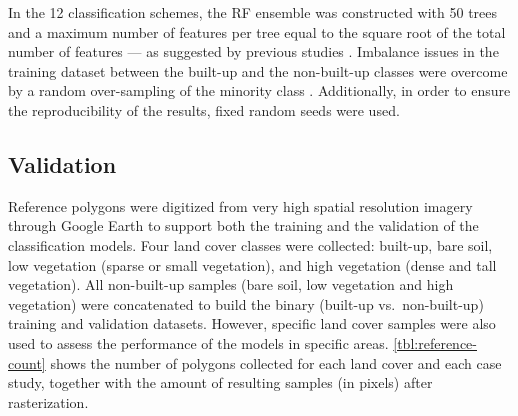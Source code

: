 \documentclass[remotesensing,article,submit,moreauthors,pdftex,10pt,a4paper]{Definitions/mdpi}
\begin{document}
In the 12 classification schemes, the RF ensemble was constructed with 50 trees
and a maximum number of features per tree equal to the square root of the total
number of features --- as suggested by previous studies \cite{Gislason2006}.
Imbalance issues in the training dataset between the built-up and the
non-built-up classes were overcome by a random over-sampling of the minority
class \cite{Lemaitre2017}. Additionally, in order to ensure the reproducibility
of the results, fixed random seeds were used.

\subsection{Validation}

Reference polygons were digitized from very high spatial resolution imagery
through Google Earth to support both the training and the validation of the
classification models. Four land cover classes were collected: built-up, bare
soil, low vegetation (sparse or small vegetation), and high vegetation (dense
and tall vegetation). All non-built-up samples (bare soil, low vegetation and
high vegetation) were concatenated to build the binary (built-up
vs.~non-built-up) training and validation datasets. However, specific land cover
samples were also used to assess the performance of the models in specific
areas. \autoref{tbl:reference-count} shows the number of polygons collected for
each land cover and each case study, together with the amount of resulting
samples (in pixels) after rasterization.
\end{document}
